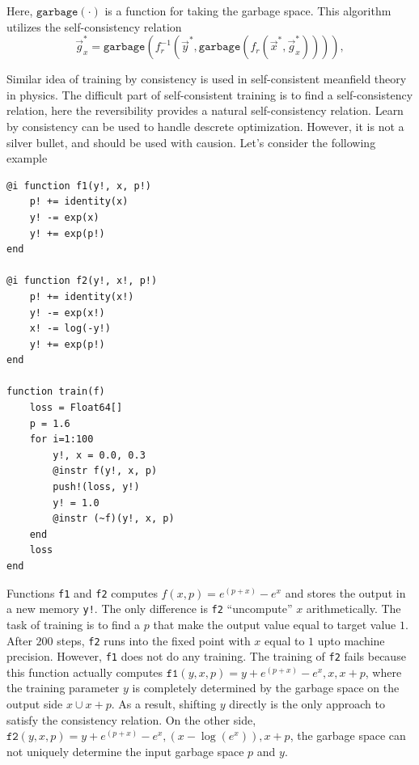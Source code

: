\documentclass[aps,twocolumn,longbibliography,english,superscriptaddress,prr]{revtex4-1}
\newcommand{\<}{\langle}
\renewcommand{\>}{\rangle}
\newcommand{\vx}{{\vec x}}
\newcommand{\vg}{{\vec g}}
\newcommand{\vy}{{\vec y}}
\newcommand{\garbage}{{\texttt{garbage}}}
\theoremstyle{definition}\newtheorem{definition}{\textit{Definition}}
\begin{document}
Here, $\garbage(\cdot)$ is a function for taking the garbage space.
This algorithm utilizes the self-consistency relation
\begin{equation}\label{eq:selfconsistent}
    \vg_x^* = \garbage(f_r^{-1}(\vy^*, \garbage(f_r(\vx^*, \vg^*_x)))),
\end{equation}

Similar idea of training by consistency is used in self-consistent meanfield theory~\cite{} in physics.
The difficult part of self-consistent training is to find a self-consistency relation, here the reversibility provides a natural self-consistency relation.
Learn by consistency can be used to handle descrete optimization. However, it is not a silver bullet, and should be used with causion.
Let's consider the following example

\begin{minipage}{.44\textwidth}
\begin{lstlisting}[basicstyle=\small\ttfamily,columns=fullflexible]
@i function f1(y!, x, p!)
    p! += identity(x)
    y! -= exp(x)
    y! += exp(p!)
end

@i function f2(y!, x!, p!)
    p! += identity(x!)
    y! -= exp(x!)
    x! -= log(-y!)
    y! += exp(p!)
end

function train(f)
    loss = Float64[]
    p = 1.6
    for i=1:100
        y!, x = 0.0, 0.3
        @instr f(y!, x, p)
        push!(loss, y!)
        y! = 1.0
        @instr (~f)(y!, x, p)
    end
    loss
end
\end{lstlisting}
\end{minipage}

Functions \texttt{f1} and \texttt{f2} computes $f(x, p) = e^{(p+x)} - e^x$ and stores the output in a new memory \texttt{y!}.
The only difference is \texttt{f2} ``uncompute'' $x$ arithmetically.
The task of training is to find a $p$ that make the output value equal to target value $1$.
After $200$ steps, \texttt{f2} runs into the fixed point with $x$ equal to $1$ upto machine precision.
However, \texttt{f1} does not do any training.
The training of \texttt{f2} fails because this function actually computes $\texttt{f1}(y, x, p) = y + e^{(p+x)} - e^{x}, x, x+p$, where the training parameter $y$ is completely determined by the garbage space on the output side $x \cup x+p$. As a result, shifting $y$ directly is the only approach to satisfy the consistency relation. On the other side, $\texttt{f2}(y, x, p) = y + e^{(p+x)} - e^x, \left(x-\log(e^x)\right), x+p$, the garbage space can not uniquely determine the input garbage space $p$ and $y$.
\end{document}
